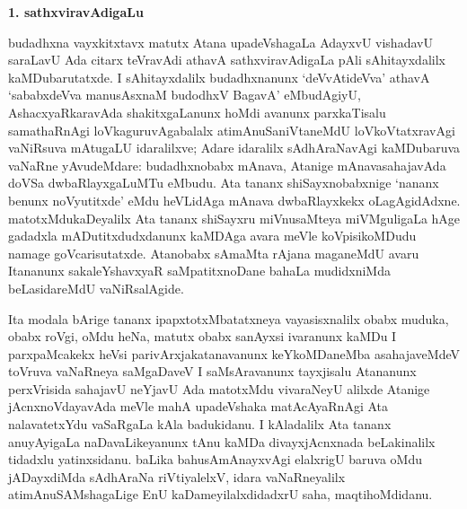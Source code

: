\begin{center}
{\textbf{\Large 1. sathxviravAdigaLu}}
\end{center}

budadhxna vayxkitxtavx matutx Atana upadeVshagaLa AdayxvU vishadavU saraLavU Ada citarx teVravAdi athavA sathxviravAdigaLa pAli sAhitayxdalilx kaMDubarutatxde. I sAhitayxdalilx budadhxnanunx `deVvAtideVva' athavA `sababxdeVva manusAsxnaM budodhxV BagavA' eMbu\-dAgiyU, AshacxyaRkaravAda shakitxgaLanunx hoMdi avanunx parxkaTisalu samathaRnAgi loVkaguruvAgabalalx atimAnuSaniVtaneMdU loVkoVtatxravAgi vaNiRsuva mAtu\-gaLU idaralilxve; Adare idaralilx sAdhAraNavAgi kaMDubaruva vaNaRne yAvudeMdare: budadhxnobabx mAnava, Atanige mAnavasahajavAda doVSa dwbaRlayxgaLuMTu eMbudu. Ata tananx shiSayxnobabxnige `nananx benunx noVyutitxde' eMdu heVLidAga mAnava dwbaRlayxkekx oLagAgidAdxne. matotxMdukaDeyalilx Ata tananx shiSayxru miVnusaMteya miVMguligaLa hAge gadadxla mADutitxdudxdanunx kaMDAga avara meVle koVpisikoMDudu namage goVcarisutatxde. Atanobabx sAmaMta rAjana maganeMdU avaru Itananunx sakaleYshavxyaR saMpatitxnoDane bahaLa mudidxniMda beLasidareMdU vaNiRsalAgide.

Ita modala bArige tananx ipapxtotxMbatatxneya vayasisxnalilx obabx muduka, obabx roVgi, oMdu heNa, matutx obabx sanAyxsi ivaranunx kaMDu I parxpaMcakekx heVsi parivArxjakatanavanunx keYkoMDaneMba asahajaveMdeV toVruva vaNaRneya saMgaDaveV I saMsAravanunx tayxjisalu Atananunx perxVrisida sahajavU neYjavU Ada matotxMdu vivaraNeyU alilxde Atanige jAcnxnoVdayavAda meVle mahA upadeVshaka matAcAyaRnAgi Ata nalavatetxYdu vaSaRgaLa kAla badukidanu. I kAladalilx Ata tananx anuyAyigaLa naDavaLikeyanunx tAnu kaMDa divayxjAcnxnada beLakinalilx tidadxlu yatinxsidanu. baLika bahusAmAnayxvAgi elalxrigU baruva oMdu jADayxdiMda sAdhAraNa riVtiyalelxV, idara vaNaRneyalilx atimAnuSAMshagaLige EnU kaDameyilalxdidadxrU saha, maqtihoMdidanu.

